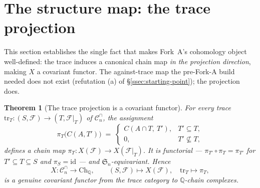 \documentclass[11pt,oneside]{amsart}
\theoremstyle{plain}
\newtheorem{theorem}{Theorem}[section]
\theoremstyle{definition}
\theoremstyle{remark}
\theoremstyle{honeststyle}
\newcommand{\F}{\mathcal{F}}
\newcommand{\Sym}{\mathfrak{S}}
\newcommand{\Q}{\mathbb{Q}}
\newcommand{\Cn}{\mathcal{C}^{\cap}_n}
\newcommand{\tr}{\mathrm{tr}}
\newcommand{\Ch}{\mathrm{Ch}}
\begin{document}
\section{The structure map: the trace projection}
\label{sec:projection}

This section establishes the single fact that makes Fork~A's
cohomology object well-defined: the trace induces a canonical chain map
\emph{in the projection direction}, making $X$ a covariant functor.
The against-trace map the pre-Fork-A build needed does not exist
(refutation (a) of \S\ref{ssec:starting-point}); the projection does.

\begin{theorem}[The trace projection is a covariant functor]
\label{thm:projection}
For every trace $\tr_T\colon(S,\F)\to(T,\F|_T)$ of $\Cn$, the
assignment
\[
  \pi_T\bigl(C(A,T')\bigr)\;=\;
  \begin{cases}
    C(A\cap T,\ T'), & T'\subseteq T,\\[2pt]
    0, & T'\not\subseteq T,
  \end{cases}
\]
defines a chain map $\pi_T\colon X(\F)\to X(\F|_T)$. It is functorial
--- $\pi_{T'}\circ\pi_T=\pi_{T'}$ for $T'\subseteq T\subseteq S$ and
$\pi_S=\mathrm{id}$ --- and $\Sym_n$-equivariant. Hence
\[
  X\colon\Cn\longrightarrow\Ch_\Q,\qquad
  (S,\F)\mapsto X(\F),\quad \tr_T\mapsto\pi_T,
\]
is a genuine \emph{covariant} functor from the trace category to
$\Q$-chain complexes.
\end{theorem}
\end{document}
